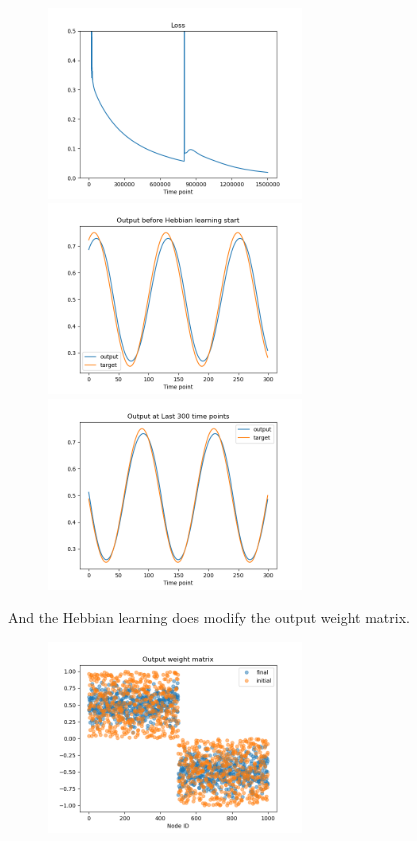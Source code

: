 \documentclass[12pt, a4paper]{article}
\begin{document}
\begin{figure}[H]
    \centering
    \includegraphics[width=0.6\textwidth]{RNN/FORCE/fig/FORCE_fbtargethebb_loss.png} \\
    \includegraphics[width=0.6\textwidth]{RNN/FORCE/fig/FORCE_fbtargethebb_SGDoutput.png} \\
    \includegraphics[width=0.6\textwidth]{RNN/FORCE/fig/FORCE_fbtargethebb_lastoutput.png} \\
\end{figure}

And the Hebbian learning does modify the output weight matrix.

\begin{figure}[H]
    \centering
    \includegraphics[width=0.6\textwidth]{RNN/FORCE/fig/FORCE_fbtargethebb_outweight.png} \\
\end{figure}
\end{document}
